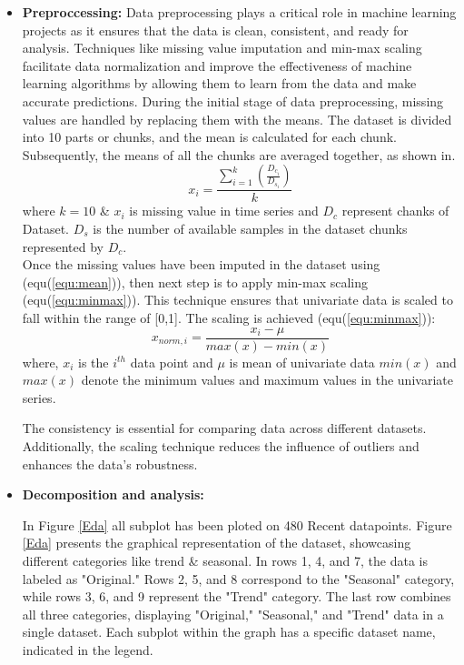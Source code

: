 \documentclass[a4paper,fleqn]{cas-dc}
\begin{document}
\begin{itemize}

\item
\textbf{Preproccessing: }
Data preprocessing plays a critical role in machine learning projects as it ensures that the data is clean, consistent, and ready for analysis. Techniques like missing value imputation and min-max scaling facilitate data normalization and improve the effectiveness of machine learning algorithms by allowing them to learn from the data and make accurate predictions.
During the initial stage of data preprocessing, missing values are handled by replacing them with the means. The dataset is divided into 10 parts or chunks, and the mean is calculated for each chunk. Subsequently, the means of all the chunks are averaged together, as shown in.
\begin{equation} \label{equ:mean}
        x_i=\frac{\sum_{i=1}^{k} \left(\frac{D_{c_{i}}}{D_{s_{i}}} \right)}{k}
\end{equation}
 where $k=10$ \& $x_i$ is missing value in time series and $D_c$ represent chanks of Dataset. $D_s$ is the number of available samples in the dataset chunks represented by $D_c$. \\
Once the missing values have been imputed in the dataset using (equ(\ref{equ:mean})), then next step is to apply min-max scaling (equ(\ref{equ:minmax})). This technique ensures that univariate data is scaled to fall within the range of [0,1]. The scaling is achieved (equ(\ref{equ:minmax})):
\begin{equation}
        x_{norm, i}=\frac{x_i - \mu}{max(x)-min(x)}
        \label{equ:minmax}
    \end{equation}
where, $x_i$ is the $i^{th}$ data point and $\mu$ is mean of univariate data $min(x)$  and $max(x)$ denote the minimum values and maximum values in the univariate series.

The consistency is essential for comparing data across different datasets. Additionally, the scaling technique reduces the influence of outliers and enhances the data's robustness.


\item
\textbf{Decomposition and analysis:}

In Figure \ref{Eda} all subplot has been ploted on 480 Recent datapoints. Figure \ref{Eda} presents the graphical representation of the dataset, showcasing different categories like trend \&  seasonal. In rows 1, 4, and 7, the data is labeled as "Original." Rows 2, 5, and 8 correspond to the "Seasonal" category, while rows 3, 6, and 9 represent the "Trend" category. The last row combines all three categories, displaying "Original," "Seasonal," and "Trend" data in a single dataset. Each subplot within the graph has a specific dataset name, indicated in the legend.


\end{itemize}
\end{document}
